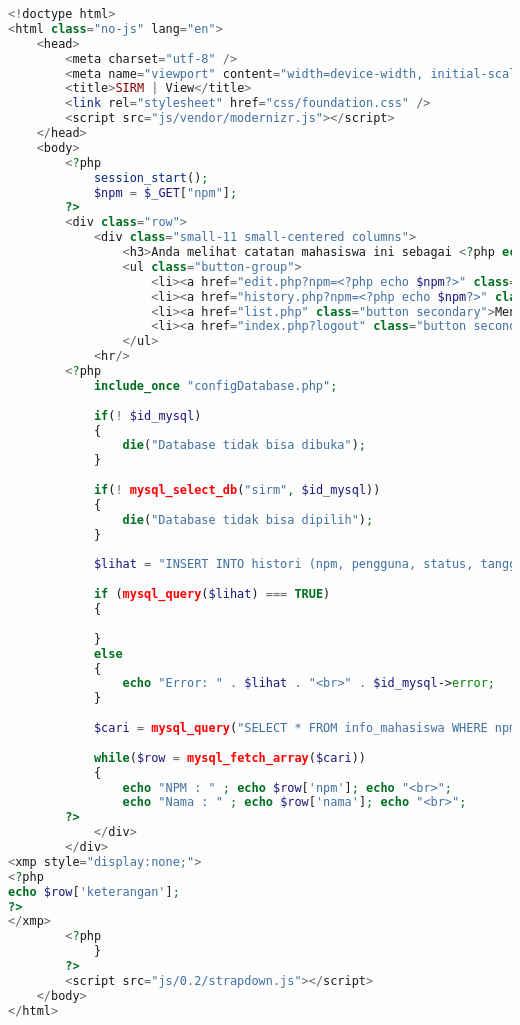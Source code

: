 \begin{lstlisting}[language=php,basicstyle=\tiny,caption=view.php]
<!doctype html>
<html class="no-js" lang="en">
	<head>
		<meta charset="utf-8" />
		<meta name="viewport" content="width=device-width, initial-scale=1.0" />
		<title>SIRM | View</title>
		<link rel="stylesheet" href="css/foundation.css" />
		<script src="js/vendor/modernizr.js"></script>
	</head>
	<body>
		<?php
			session_start();
			$npm = $_GET["npm"];
		?>
		<div class="row">
			<div class="small-11 small-centered columns">
				<h3>Anda melihat catatan mahasiswa ini sebagai <?php echo $_SESSION['email']?>.</h3>
				<ul class="button-group">
					<li><a href="edit.php?npm=<?php echo $npm?>" class="button secondary">Edit</a></li>
					<li><a href="history.php?npm=<?php echo $npm?>" class="button secondary">Lihat Histori</a></li>
					<li><a href="list.php" class="button secondary">Menu Utama</a></li>
					<li><a href="index.php?logout" class="button secondary">Logout</a></li>
				</ul>
			<hr/>
		<?php
			include_once "configDatabase.php";
			
			if(! $id_mysql)
			{
				die("Database tidak bisa dibuka");
			}
				
			if(! mysql_select_db("sirm", $id_mysql))
			{
				die("Database tidak bisa dipilih");
			}
			
			$lihat = "INSERT INTO histori (npm, pengguna, status, tanggal_pembaruan, keterangan) VALUES ('". mysql_real_escape_string($npm)  ."', '".$_SESSION['email']."', 'melihat', now(), '')";
			
			if (mysql_query($lihat) === TRUE) 
			{
				
			}
			else
			{
				echo "Error: " . $lihat . "<br>" . $id_mysql->error;
			}
			
			$cari = mysql_query("SELECT * FROM info_mahasiswa WHERE npm='$npm'", $id_mysql);
			
			while($row = mysql_fetch_array($cari))
			{
				echo "NPM : " ; echo $row['npm']; echo "<br>";
				echo "Nama : " ; echo $row['nama']; echo "<br>";
		?>
			</div>
		</div>
<xmp style="display:none;">
<?php
echo $row['keterangan'];
?>
</xmp>
		<?php
			}
		?>
		<script src="js/0.2/strapdown.js"></script>
	</body>
</html>
\end{lstlisting}


